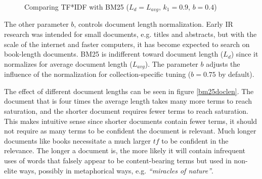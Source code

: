 \begin{figure}[h]
  
  
  \caption{Comparing TF*IDF with BM25 ($L_d = L_{avg}$, $k_1 = 0.9$, $b = 0.4$)} \label{tfm}
\end{figure}



The other parameter $b$, controls document length normalization. Early IR research was intended for small documents, e.g. titles and abstracts, but with the scale of the internet and faster computers, it has become expected to search on book-length documents. BM25 is indifferent toward document length ($L_d$) since it normalizes for average document length ($L_{avg}$). The parameter $b$ adjusts the influence of the normalization for collection-specific tuning ($b=0.75$ by default). 

The effect of different document lengths can be seen in figure \ref{bm25doclen}. The document that is four times the average length takes many more terms to reach saturation, and the shorter document requires fewer terms to reach saturation. This makes intuitive sense since shorter documents contain fewer terms, it should not require as many terms to be confident the document is relevant. Much longer documents like books necessitate a much larger $\mathit{tf}$ to be confident in the relevance. The longer a document is, the more likely it will contain infrequent uses of words that falsely appear to be content-bearing terms but used in non-elite ways, possibly in metaphorical ways, e.g. \textit{``miracles of nature''}.

